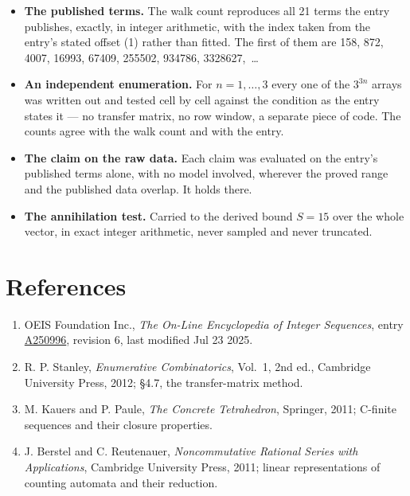\documentclass[11pt]{article}
\theoremstyle{definition}
\begin{document}
\begin{itemize}

\item {\bfseries The published terms.} The walk count reproduces all 21 terms the entry publishes, exactly, in integer arithmetic, with the index taken from the entry's stated offset (1) rather than fitted. The first of them are 158, 872, 4007, 16993, 67409, 255502, 934786, 3328627,~\dots

\item {\bfseries An independent enumeration.} For $n = 1,\dots,3$ every one of the $3^{3n}$ arrays was written out and tested cell by cell against the condition as the entry states it --- no transfer matrix, no row window, a separate piece of code. The counts agree with the walk count and with the entry.

\item {\bfseries The claim on the raw data.} Each claim was evaluated on the entry's published terms alone, with no model involved, wherever the proved range and the published data overlap. It holds there.

\item {\bfseries The annihilation test.} Carried to the derived bound $S = 15$ over the whole vector, in exact integer arithmetic, never sampled and never truncated.

\end{itemize}

\section{References}

\begin{enumerate}

\item OEIS Foundation Inc., \emph{The On-Line Encyclopedia of Integer Sequences}, entry \href{https://oeis.org/A250996}{A250996}, revision 6, last modified Jul 23 2025.

\item R. P. Stanley, \emph{Enumerative Combinatorics}, Vol.~1, 2nd ed., Cambridge University Press, 2012; \S4.7, the transfer-matrix method.

\item M. Kauers and P. Paule, \emph{The Concrete Tetrahedron}, Springer, 2011; C-finite sequences and their closure properties.

\item J. Berstel and C. Reutenauer, \emph{Noncommutative Rational Series with Applications}, Cambridge University Press, 2011; linear representations of counting automata and their reduction.

\end{enumerate}
\end{document}
